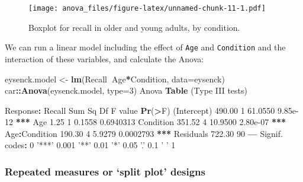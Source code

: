 \documentclass[]{article}
\newenvironment{Shaded}{\begin{snugshade}}{\end{snugshade}}
\newcommand{\DataTypeTok}[1]{\textcolor[rgb]{0.13,0.29,0.53}{#1}}
\newcommand{\DecValTok}[1]{\textcolor[rgb]{0.00,0.00,0.81}{#1}}
\newcommand{\ErrorTok}[1]{\textcolor[rgb]{0.64,0.00,0.00}{\textbf{#1}}}
\newcommand{\FloatTok}[1]{\textcolor[rgb]{0.00,0.00,0.81}{#1}}
\newcommand{\KeywordTok}[1]{\textcolor[rgb]{0.13,0.29,0.53}{\textbf{#1}}}
\newcommand{\NormalTok}[1]{#1}
\newcommand{\OperatorTok}[1]{\textcolor[rgb]{0.81,0.36,0.00}{\textbf{#1}}}
\newcommand{\StringTok}[1]{\textcolor[rgb]{0.31,0.60,0.02}{#1}}
\begin{document}
\begin{figure}
\centering
\texttt{[image: anova\_files/figure-latex/unnamed-chunk-11-1.pdf]}
\caption{\label{fig:unnamed-chunk-11}Boxplot for recall in older and young adults, by condition.}
\end{figure}

We can run a linear model including the effect of \texttt{Age} and \texttt{Condition} and the
interaction of these variables, and calculate the Anova:

\begin{Shaded}
\begin{Highlighting}[]
\NormalTok{eysenck.model <-}\StringTok{ }\KeywordTok{lm}\NormalTok{(Recall}\OperatorTok{~}\NormalTok{Age}\OperatorTok{*}\NormalTok{Condition, }\DataTypeTok{data=}\NormalTok{eysenck)}
\NormalTok{car}\OperatorTok{::}\KeywordTok{Anova}\NormalTok{(eysenck.model, }\DataTypeTok{type=}\DecValTok{3}\NormalTok{)}
\NormalTok{Anova }\KeywordTok{Table}\NormalTok{ (Type III tests)}

\NormalTok{Response}\OperatorTok{:}\StringTok{ }\NormalTok{Recall}
\NormalTok{              Sum Sq Df F value    }\KeywordTok{Pr}\NormalTok{(}\OperatorTok{>}\NormalTok{F)    }
\NormalTok{(Intercept)   }\FloatTok{490.00}  \DecValTok{1} \FloatTok{61.0550}  \FloatTok{9.85e-12} \OperatorTok{**}\ErrorTok{*}
\NormalTok{Age             }\FloatTok{1.25}  \DecValTok{1}  \FloatTok{0.1558} \FloatTok{0.6940313}    
\NormalTok{Condition     }\FloatTok{351.52}  \DecValTok{4} \FloatTok{10.9500}  \FloatTok{2.80e-07} \OperatorTok{**}\ErrorTok{*}
\NormalTok{Age}\OperatorTok{:}\NormalTok{Condition }\FloatTok{190.30}  \DecValTok{4}  \FloatTok{5.9279} \FloatTok{0.0002793} \OperatorTok{**}\ErrorTok{*}
\NormalTok{Residuals     }\FloatTok{722.30} \DecValTok{90}                      
\OperatorTok{---}
\NormalTok{Signif. codes}\OperatorTok{:}\StringTok{  }\DecValTok{0} \StringTok{'***'} \FloatTok{0.001} \StringTok{'**'} \FloatTok{0.01} \StringTok{'*'} \FloatTok{0.05} \StringTok{'.'} \FloatTok{0.1} \StringTok{' '} \DecValTok{1}
\end{Highlighting}
\end{Shaded}

\hypertarget{repeated-measures}{%
\subsubsection*{Repeated measures or `split plot' designs}\label{repeated-measures}}
\end{document}
